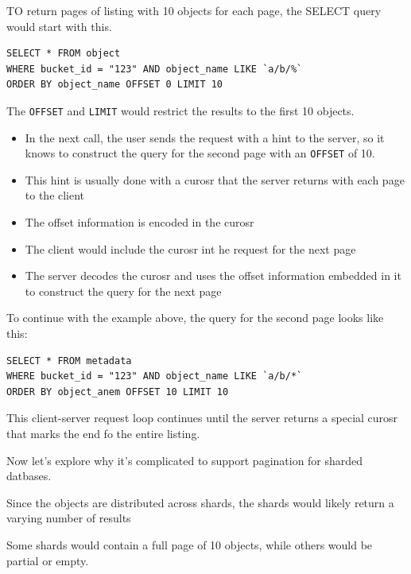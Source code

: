 \documentclass{report}
\theoremstyle{definition}
\begin{document}
TO return pages of listing with 10 objects for each page, the SELECT query would start with this.

\begin{lstlisting}
SELECT * FROM object
WHERE bucket_id = "123" AND object_name LIKE `a/b/%`
ORDER BY object_name OFFSET 0 LIMIT 10
\end{lstlisting}

The \lstinline|OFFSET| and \lstinline|LIMIT| would restrict the results to the first 10 objects.

\begin{itemize}
\item
In the next call, the user sends the request with a hint to the server, so it knows to construct the query for the second page with an \lstinline|OFFSET| of 10.
\item
This hint is usually done with a curosr that the server returns with each page to the client
\item
The offset information is encoded in the curosr
\item
The client would include the curosr int he request for the next page
\item
The server decodes the curosr and uses the offset information embedded in it to construct the query for the next page
\end{itemize}

To continue with the example above, the query for the second page looks like this:

\begin{lstlisting}
SELECT * FROM metadata
WHERE bucket_id = "123" AND object_name LIKE `a/b/*`
ORDER BY object_anem OFFSET 10 LIMIT 10
\end{lstlisting}

This client-server request loop continues until the server returns a special curosr that marks the end fo the entire listing.

Now let's explore why it's complicated to support pagination for sharded datbases.

Since the objects are distributed across shards, the shards would likely return a varying number of results

Some shards would contain a full page of 10 objects, while others would be partial or empty.
\end{document}
